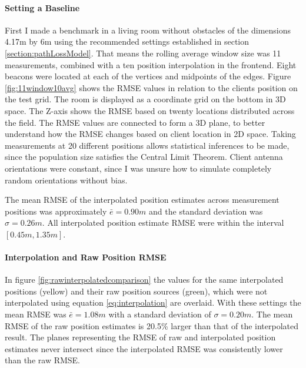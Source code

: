 \documentclass[a4paper, oneside]{ipsreport}
\begin{document}
\paragraph{Setting a Baseline}
First I made a benchmark in a living room without obstacles of the dimensions 4.17m by 6m using the recommended settings established in section \ref{section:pathLossModel}. That means the rolling average window size was 11 measurements, combined with a ten position interpolation in the frontend. Eight beacons were located at each of the vertices and midpoints of the edges. Figure \ref{fig:11window10avg} shows the RMSE values in relation to the clients position on the test grid. The room is displayed as a coordinate grid on the bottom in 3D space. The Z-axis shows the RMSE based on twenty locations distributed across the field. The RMSE values are connected to form a 3D plane, to better understand how the RMSE changes based on client location in 2D space. Taking measurements at 20 different positions allows statistical inferences to be made, since the population size satisfies the Central Limit Theorem. Client antenna orientations were constant, since I was unsure how to simulate completely random orientations without bias.

The mean RMSE of the interpolated position estimates across measurement positions was approximately $\bar{e} = 0.90m$ and the standard deviation was $\sigma = 0.26m$. All interpolated position estimate RMSE were within the interval $[0.45 m, 1.35 m]$.

\paragraph{Interpolation and Raw Position RMSE}
In figure \ref{fig:rawinterpolatedcomparison} the values for the same interpolated positions (yellow) and their raw position sources (green), which were not interpolated using equation \ref{eq:interpolation} are overlaid. With these settings the mean RMSE was $\bar{e} = 1.08m$ with a standard deviation of $\sigma = 0.20m$. The mean RMSE of the raw position estimates is 20.5\% larger than that of the interpolated result. The planes representing the RMSE of raw and interpolated position estimates never intersect since the interpolated RMSE was consistently lower than the raw RMSE.
\end{document}
